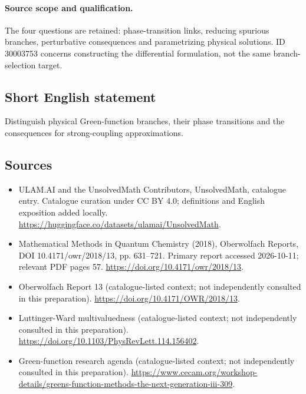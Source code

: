 \documentclass[11pt]{article}
\begin{document}
\paragraph{Source scope and qualification.}
The four questions are retained: phase-transition links, reducing spurious branches, perturbative consequences and parametrizing physical solutions. ID 30003753 concerns constructing the differential formulation, not the same branch-selection target.
\subsection{Short English statement}
Distinguish physical Green-function branches, their phase transitions and the consequences for strong-coupling approximations.
\subsection{Sources}
\begin{itemize}
\item[\hypertarget{source:statement:1}{S1}] ULAM.AI and the UnsolvedMath Contributors, UnsolvedMath, catalogue entry. Catalogue curation under CC BY 4.0; definitions and English exposition added locally.
\url{https://huggingface.co/datasets/ulamai/UnsolvedMath}.
\item[\hypertarget{source:statement:2}{S2}] Mathematical Methods in Quantum Chemistry (2018), Oberwolfach Reports, DOI 10.4171/owr/2018/13, pp. 631--721. Primary report accessed 2026-10-11; relevant PDF pages 57.
\url{https://doi.org/10.4171/owr/2018/13}.
\item[\hypertarget{source:statement:3}{S3}] Oberwolfach Report 13 (catalogue-listed context; not independently consulted in this preparation).
\url{https://doi.org/10.4171/OWR/2018/13}.
\item[\hypertarget{source:statement:4}{S4}] Luttinger-Ward multivaluedness (catalogue-listed context; not independently consulted in this preparation).
\url{https://doi.org/10.1103/PhysRevLett.114.156402}.
\item[\hypertarget{source:statement:5}{S5}] Green-function research agenda (catalogue-listed context; not independently consulted in this preparation).
\url{https://www.cecam.org/workshop-details/greens-function-methods-the-next-generation-iii-309}.
\end{itemize}
\label{end:statement}
\end{document}
